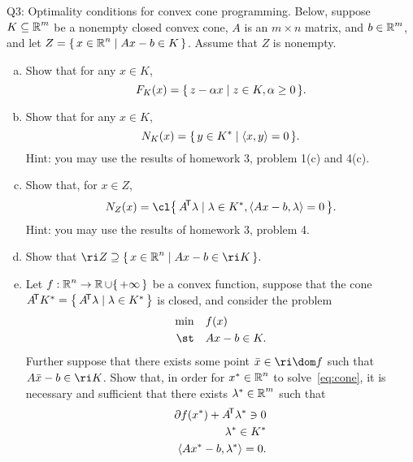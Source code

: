 \documentclass{article}
\begin{document}
\begin{problem}
    {Q3: Optimality conditions for convex cone programming.}
    Below, suppose $K\subseteq\operatorname{\mathbb{R}}^m$ be a nonempty closed convex cone, $A$ is an $m\times n$ matrix, and $b\in\operatorname{\mathbb{R}}^m$, and let $Z=\left\lbrace\,x\in\operatorname{\mathbb{R}}^n\mid Ax-b\in K\,\right\rbrace$. Assume that $Z$ is nonempty.
    \begin{enumerate}[(a)]
        \item Show that for any $x\in K$, \[F_K(x)=\set{z-\alpha x\mid z\in K, \alpha\geq 0}.\]
        \item Show that for any $x\in K$, \[N_K(x)=\set{y\in K^*\mid \angles*{x,y}=0}.\]
        Hint: you may use the results of homework 3, problem 1(c) and 4(c).
        \item Show that, for $x\in Z$, \[N_Z(x)=\cl\set{A\trn\lambda\mid\lambda\in K^*,\angles{Ax-b,\lambda}=0}.\]
        Hint: you may use the results of homework 3, problem 4.
        \item Show that $\ri Z \supseteq\set{x\in\R^n\mid Ax-b\in\ri K}.$
        \item Let $f:\R^n\rightarrow\R\cup\set{+\infty}$ be a convex function, suppose that the cone $A\!^{\mathsf{T}} K^*=\left\lbrace\,A\!^{\mathsf{T}}\lambda\mid\lambda\in K^*\,\right\rbrace$ is closed, and consider the problem{
            \begin{equation}
                \begin{aligned}
                    \min & \quad f(x) \\
                    \st & \quad Ax-b\in K.
                \end{aligned}
                \label{eq:cone}
            \end{equation}
        }
        Further suppose that there exists some point $\bar{x}\in\ri\dom f$ such that $A\bar{x}-b\in\ri K$. Show that, in order for $x^*\in\operatorname{\mathbb{R}}^n$ to solve~\cref{eq:cone}, it is necessary and sufficient that there exists $\lambda^*\in \operatorname{\mathbb{R}}^m$ such that
        \begin{align*}
            \partial f(x^*)+A\!^{\mathsf{T}}\lambda^*\ni 0 \\
            \lambda^*\in K^* \\
            \langle Ax^*-b,\lambda^*\rangle=0.
        \end{align*}
    \end{enumerate}
\end{problem}
\end{document}
